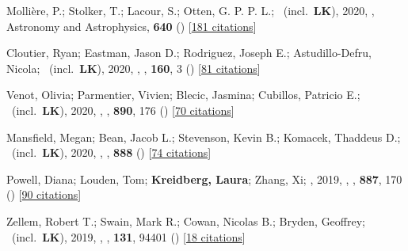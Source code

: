 \item[{\color{numcolor}\scriptsize36}] Molli{\`e}re, P.; Stolker, T.; Lacour, S.; Otten, G. P. P. L.; \etal\ (incl.\ \textbf{LK}), 2020, , Astronomy and Astrophysics, \textbf{640} () [\href{https://ui.adsabs.harvard.edu/abs/2020A&A...640A.131M}{181 citations}]

\item[{\color{numcolor}\scriptsize35}] Cloutier, Ryan; Eastman, Jason D.; Rodriguez, Joseph E.; Astudillo-Defru, Nicola; \etal\ (incl.\ \textbf{LK}), 2020, , \aj, \textbf{160}, 3 () [\href{https://ui.adsabs.harvard.edu/abs/2020AJ....160....3C}{81 citations}]

\item[{\color{numcolor}\scriptsize34}] Venot, Olivia; Parmentier, Vivien; Blecic, Jasmina; Cubillos, Patricio E.; \etal\ (incl.\ \textbf{LK}), 2020, , \apj, \textbf{890}, 176 () [\href{https://ui.adsabs.harvard.edu/abs/2020ApJ...890..176V}{70 citations}]

\item[{\color{numcolor}\scriptsize33}] Mansfield, Megan; Bean, Jacob L.; Stevenson, Kevin B.; Komacek, Thaddeus D.; \etal\ (incl.\ \textbf{LK}), 2020, , \apj, \textbf{888} () [\href{https://ui.adsabs.harvard.edu/abs/2020ApJ...888L..15M}{74 citations}]

\item[{\color{numcolor}\scriptsize32}] Powell, Diana; Louden, Tom; \textbf{Kreidberg, Laura}; Zhang, Xi; \etal, 2019, , \apj, \textbf{887}, 170 () [\href{https://ui.adsabs.harvard.edu/abs/2019ApJ...887..170P}{90 citations}]

\item[{\color{numcolor}\scriptsize31}] Zellem, Robert T.; Swain, Mark R.; Cowan, Nicolas B.; Bryden, Geoffrey; \etal\ (incl.\ \textbf{LK}), 2019, , \pasp, \textbf{131}, 94401 () [\href{https://ui.adsabs.harvard.edu/abs/2019PASP..131i4401Z}{18 citations}]

